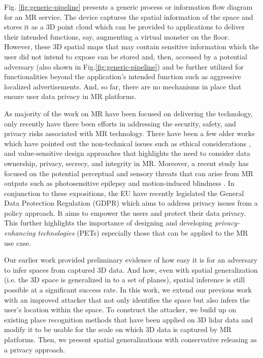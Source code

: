 Fig. \ref{fig:generic-pipeline} presents a generic process or information flow diagram for an MR service. The device captures the spatial information of the space and stores it as a 3D point cloud which can be provided to applications to deliver their intended functions, say, augmenting a virtual monster on the floor. However, these 3D spatial maps that may contain sensitive information which the user did not intend to expose can be stored and, then, accessed by a potential adversary (also shown in Fig.\ref{fig:generic-pipeline}) and be further utilized for functionalities beyond the application's intended function such as aggressive localized advertisements. And, so far, there are no mechanisms in place that ensure user data privacy in MR platforms.

As majority of the work on MR have been focused on delivering the technology, %
only recently have there been efforts in addressing the security, safety, and privacy risks associated with MR technology. There have been a few older works which have pointed out the non-technical issues such as ethical considerations \cite{heimo2014ethical}, and value-sensitive design approaches \cite{friedman2000value} that highlights the need to consider data ownership, privacy, secrecy, and integrity in MR. Moreover, a recent study has focused on the potential perceptual and sensory threats that can arise from MR outputs such as photosensitive epilepsy and motion-induced blindness \cite{baldassi2018challenges}. In conjunction to these expositions, the EU have recently legislated the General Data Protection Regulation (GDPR) which aims to address privacy issues from a policy approach. It aims to empower the users and protect their data privacy. This further highlights the importance of designing and developing \textit{privacy-enhancing technologies} (PETs) especially those that can be applied to the MR use case.

Our earlier work \cite{deguzman2019firstlook} provided preliminary evidence of how easy it is for an adversary to infer spaces from captured 3D data. And how, even with spatial generalization (i.e. the 3D space is generalized in to a set of planes), spatial inference is still possible at a significant success rate. In this work, we extend our previous work with an improved attacker that not only identifies the space but also infers the user's location within the space. To construct the attacker, we build up on existing place recognition methods that have been applied on 3D lidar data and modify it to be usable for the scale on which 3D data is captured by MR platforms. Then, we present spatial generalizations with conservative releasing as a privacy approach. %

